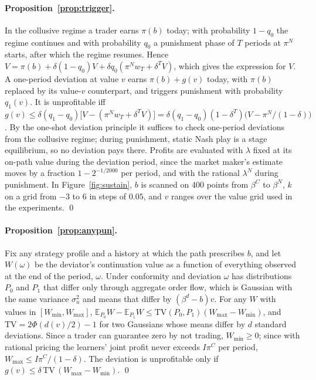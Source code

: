 \paragraph{Proposition~\ref{prop:trigger}.} In the collusive regime a
trader earns $\pi(b)$ today; with probability $1-q_0$ the regime continues and
with probability $q_0$ a punishment phase of $T$ periods at $\pi^N$ starts,
after which the regime resumes. Hence
$V=\pi(b)+\delta(1-q_0)V+\delta q_0(\pi^Nw_T+\delta^TV)$, which gives the
expression for $V$. A one-period deviation at value $v$ earns $\pi(b)+g(v)$
today, with $\pi(b)$ replaced by its value-$v$ counterpart, and triggers
punishment with probability $q_1(v)$. It is unprofitable iff
$g(v)\le\delta(q_1-q_0)\big[V-(\pi^Nw_T+\delta^TV)\big]
=\delta(q_1-q_0)(1-\delta^T)\big(V-\pi^N/(1-\delta)\big)$. By the one-shot
deviation principle it suffices to check one-period deviations from the
collusive regime; during punishment, static Nash play is a stage
equilibrium, so no deviation pays there. Profits are evaluated with
$\lambda$ fixed at its on-path value during the deviation period, since the
market maker's estimate moves by a fraction $1-2^{-1/2000}$ per period, and
with the rational $\lambda^N$ during punishment. In
Figure~\ref{fig:sustain}, $b$ is scanned on 400 points from $\beta^C$ to
$\beta^N$, $k$ on a grid from $-3$ to $6$ in steps of $0.05$, and $v$ ranges
over the value grid used in the experiments. \qed

\paragraph{Proposition~\ref{prop:anypun}.} Fix any strategy profile and a
history at which the path prescribes $b$, and let $W(\omega)$ be the
deviator's continuation value as a function of everything observed at the
end of the period, $\omega$. Under conformity and deviation $\omega$ has
distributions $P_0$ and $P_1$ that differ only through aggregate order flow,
which is Gaussian with the same variance $\sigma_u^2$ and means that differ by
$(\beta^d-b)v$. For any $W$ with values in $[W_{\min},W_{\max}]$,
$\mathbb E_{P_0}W-\mathbb E_{P_1}W\le \mathrm{TV}(P_0,P_1)(W_{\max}-W_{\min})$,
and $\mathrm{TV}=2\Phi(d(v)/2)-1$ for two Gaussians whose means differ by $d$
standard deviations. Since a trader can guarantee zero by not trading,
$W_{\min}\ge0$; since with rational pricing the learners' joint profit never
exceeds $I\pi^C$ per period, $W_{\max}\le I\pi^C/(1-\delta)$. The deviation is
unprofitable only if $g(v)\le\delta\,\mathrm{TV}\,(W_{\max}-W_{\min})$. \qed

